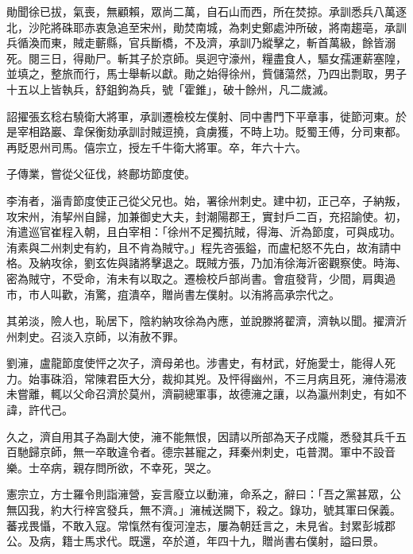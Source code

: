 \begin{pinyinscope}
 勛聞徐已拔，氣喪，無顧賴，眾尚二萬，自石山而西，所在焚掠。承訓悉兵八萬逐北，沙陀將硃耶赤衷急追至宋州，勛焚南城，為刺史鄭處沖所破，將南趨亳，承訓兵循渙而東，賊走蘄縣，官兵斷橋，不及濟，承訓乃縱擊之，斬首萬級，餘皆溺死。閱三日，得勛尸。斬其子於京師。吳迥守濠州，糧盡食人，驅女孺運薪塞隍，並填之，整旅而行，馬士舉斬以獻。勛之始得徐州，貲儲蕩然，乃四出剽取，男子十五以上皆執兵，舒鉏鉤為兵，號「霍錐」，破十餘州，凡二歲滅。



 詔擢張玄稔右驍衛大將軍，承訓遷檢校左僕射、同中書門下平章事，徙節河東。於是宰相路巖、韋保衡劾承訓討賊逗撓，貪虜獲，不時上功。貶蜀王傅，分司東都。再貶恩州司馬。僖宗立，授左千牛衛大將軍。卒，年六十六。



 子傳業，嘗從父征伐，終鄜坊節度使。



 李洧者，淄青節度使正己從父兄也。始，署徐州刺史。建中初，正己卒，子納叛，攻宋州，洧挈州自歸，加兼御史大夫，封潮陽郡王，實封戶二百，充招諭使。初，洧遣巡官崔程入朝，且白宰相：「徐州不足獨抗賊，得海、沂為節度，可與成功。洧素與二州刺史有約，且不肯為賊守。」程先咨張鎰，而盧杞怒不先白，故洧請中格。及納攻徐，劉玄佐與諸將擊退之。既賊方張，乃加洧徐海沂密觀察使。時海、密為賊守，不受命，洧未有以取之。遷檢校戶部尚書。會疽發背，少間，肩輿過市，市人叫歡，洧驚，疽潰卒，贈尚書左僕射。以洧將高承宗代之。



 其弟淡，險人也，恥居下，陰約納攻徐為內應，並說滕將翟濟，濟執以聞。擢濟沂州刺史。召淡入京師，以洧赦不罪。



 劉澭，盧龍節度使怦之次子，濟母弟也。涉書史，有材武，好施愛士，能得人死力。始事硃滔，常陳君臣大分，裁抑其兇。及怦得幽州，不三月病且死，澭侍湯液未嘗離，輒以父命召濟於莫州，濟嗣總軍事，故德澭之讓，以為瀛州刺史，有如不諱，許代己。



 久之，濟自用其子為副大使，澭不能無恨，因請以所部為天子戍隴，悉發其兵千五百馳歸京師，無一卒敢違令者。德宗甚寵之，拜秦州刺史，屯普潤。軍中不設音樂。士卒病，親存問所欲，不幸死，哭之。



 憲宗立，方士羅令則詣澭營，妄言廢立以動澭，命系之，辭曰：「吾之黨甚眾，公無囚我，約大行梓宮發兵，無不濟。」澭械送闕下，殺之。錄功，號其軍曰保義。蕃戎畏懾，不敢入寇。常愾然有復河湟志，屢為朝廷言之，未見省。封累彭城郡公。及病，籍士馬求代。既還，卒於道，年四十九，贈尚書右僕射，謚曰景。




\end{pinyinscope}
